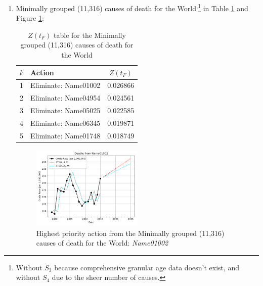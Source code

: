 \documentclass[12pt, a4paper, twocolumn]{article}
\begin{document}
\begin{enumerate}
  \vfill\eject
  \item Minimally grouped (11,316) causes of death for the World\cite{whomortality}\textsuperscript{,}\footnote{\label{no_s3}Without $S_3$ because comprehensive granular age data doesn't exist, and without $S_4$ due to the sheer number of causes.} in Table \ref{table:ztable8} and Figure \ref{fig:k8}:
    \begin{table}[H]
      \centering
      \begin{tabular}{clc}
        \toprule
          $k$ & Action               & $Z(t_F)$ \\
        \midrule
          1   & Eliminate: Name01002 & 0.026866 \\
          2   & Eliminate: Name04954 & 0.024561 \\
          3   & Eliminate: Name05025 & 0.022585 \\
          4   & Eliminate: Name06345 & 0.019871 \\
          5   & Eliminate: Name01748 & 0.018749 \\
        \bottomrule
      \end{tabular}
      \caption{$Z(t_F)$ table for the Minimally grouped (11,316) causes of death for the World}
      \label{table:ztable8}
    \end{table}
    \begin{figure}[H]
      \centering
      \includegraphics[width=0.5\textwidth]{results/WORLD_ICD10_MINIMALLY_GROUPED/Name01002_ets.png}
      \caption{Highest priority action from the Minimally grouped (11,316) causes of death for the World: \textit{Name01002}}\label{fig:k8}
    \end{figure}
  

\end{enumerate}
\end{document}
